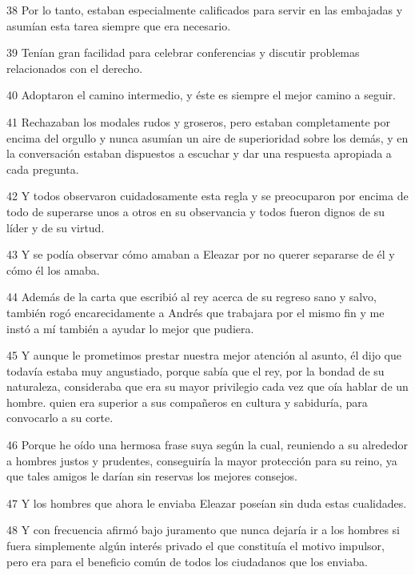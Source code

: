 \par 38 Por lo tanto, estaban especialmente calificados para servir en las embajadas y asumían esta tarea siempre que era necesario.

\par 39 Tenían gran facilidad para celebrar conferencias y discutir problemas relacionados con el derecho.

\par 40 Adoptaron el camino intermedio, y éste es siempre el mejor camino a seguir.

\par 41 Rechazaban los modales rudos y groseros, pero estaban completamente por encima del orgullo y nunca asumían un aire de superioridad sobre los demás, y en la conversación estaban dispuestos a escuchar y dar una respuesta apropiada a cada pregunta.

\par 42 Y todos observaron cuidadosamente esta regla y se preocuparon por encima de todo de superarse unos a otros en su observancia y todos fueron dignos de su líder y de su virtud.

\par 43 Y se podía observar cómo amaban a Eleazar por no querer separarse de él y cómo él los amaba.

\par 44 Además de la carta que escribió al rey acerca de su regreso sano y salvo, también rogó encarecidamente a Andrés que trabajara por el mismo fin y me instó a mí también a ayudar lo mejor que pudiera.

\par 45 Y aunque le prometimos prestar nuestra mejor atención al asunto, él dijo que todavía estaba muy angustiado, porque sabía que el rey, por la bondad de su naturaleza, consideraba que era su mayor privilegio cada vez que oía hablar de un hombre. quien era superior a sus compañeros en cultura y sabiduría, para convocarlo a su corte.

\par 46 Porque he oído una hermosa frase suya según la cual, reuniendo a su alrededor a hombres justos y prudentes, conseguiría la mayor protección para su reino, ya que tales amigos le darían sin reservas los mejores consejos.

\par 47 Y los hombres que ahora le enviaba Eleazar poseían sin duda estas cualidades.

\par 48 Y con frecuencia afirmó bajo juramento que nunca dejaría ir a los hombres si fuera simplemente algún interés privado el que constituía el motivo impulsor, pero era para el beneficio común de todos los ciudadanos que los enviaba.

